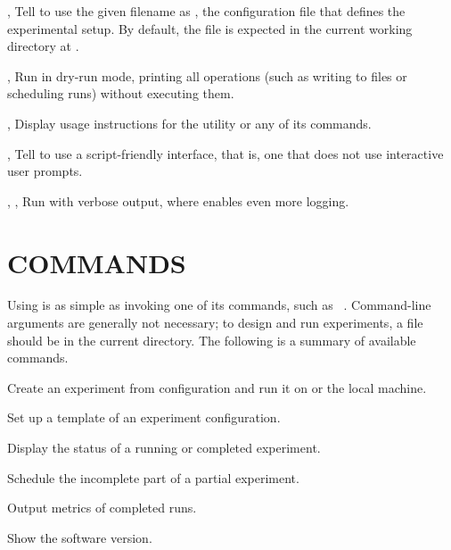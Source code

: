 \documentclass[a4paper,english]{article}
\begin{document}
\begin{adjustwidth}{18pt}{0pt}
        \begin{Description}[Options]
            \item[\oOptArg{-c}{ filename}, \OptArg{--config}{ filename}]
            Tell  to use the given filename as , the configuration
            file that defines the experimental setup.
            By default, the file is expected in the current working directory at .
            \item[\Opt{-d}, \Opt{--dry-run}]
            Run  in dry-run mode, printing all operations (such as writing to files or scheduling runs)
            without executing them.
            \item[\Opt{-h}, \Opt{--help}]
            Display usage instructions for the  utility or any of its commands.
            \item[\Opt{-s}, \Opt{--script}]
            Tell  to use a script-friendly interface, that is, one that does not use
            interactive user prompts.
            \item[\Opt{-v}, \Opt{-vv}, \Opt{--verbose}]
            Run  with verbose output, where  enables even more logging.
        \end{Description}

    \section{COMMANDS}

        Using  is as simple as invoking one of its commands, such as
        ~.
        Command-line arguments are generally not necessary; to design and run
        experiments, a  file should be in the current directory.
        The following is a summary of available commands.

        \begin{Description}[Commands]
            \item[\Prog{gourd} \Arg{run}]
            Create an experiment from configuration and run it on  or the local machine.
            \item[\Prog{gourd} \Arg{init}]
            Set up a template of an experiment configuration.
            \item[\Prog{gourd} \Arg{status}]
            Display the status of a running or completed experiment.
            \item[\Prog{gourd} \Arg{continue}]
            Schedule the incomplete part of a partial experiment.
            \item[\Prog{gourd} \Arg{analyse}]
            Output metrics of completed runs.
            \item[\Prog{gourd} \Arg{version}]
            Show the software version.
        \end{Description}


\end{adjustwidth}
\end{document}
